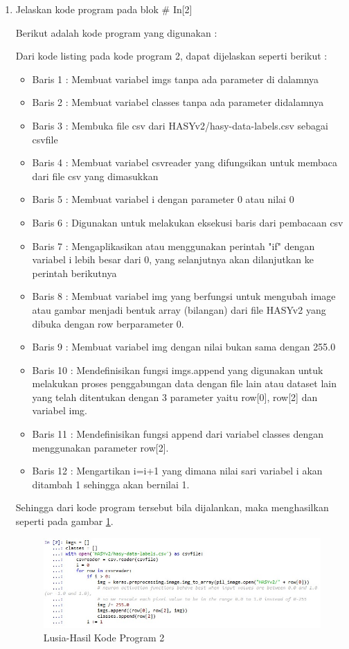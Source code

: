 \begin{enumerate}
\item Jelaskan kode program pada blok \# In[2]
	\par Berikut adalah kode program yang digunakan :
	
	\par Dari kode listing pada kode program 2, dapat dijelaskan seperti berikut :
	\begin{itemize}
	\item Baris 1	: Membuat variabel imgs tanpa ada parameter di dalamnya
	\item Baris 2	: Membuat variabel classes tanpa ada parameter didalamnya
	\item Baris 3	: Membuka file csv dari HASYv2/hasy-data-labels.csv sebagai csvfile
	\item Baris 4	: Membuat variabel csvreader yang difungsikan untuk membaca dari file csv yang dimasukkan
	\item Baris 5	: Membuat variabel i dengan parameter 0 atau nilai 0
	\item Baris 6	: Digunakan untuk melakukan eksekusi baris dari pembacaan csv 
	\item Baris 7	: Mengaplikasikan atau menggunakan perintah "if" dengan variabel i lebih besar dari 0, yang selanjutnya akan dilanjutkan ke perintah berikutnya
	\item Baris 8	: Membuat variabel img yang berfungsi untuk mengubah image atau gambar menjadi bentuk array (bilangan) dari file HASYv2 yang dibuka dengan row berparameter 0.
	\item Baris 9	: Membuat variabel img dengan nilai bukan sama dengan 255.0
	\item Baris 10	: Mendefinisikan fungsi imgs.append yang digunakan untuk melakukan proses penggabungan data dengan file lain atau dataset lain yang telah ditentukan dengan 3 parameter yaitu row[0], row[2] dan variabel img.
	\item Baris 11	: Mendefinisikan fungsi append dari variabel classes dengan menggunakan parameter row[2].
	\item Baris 12	: Mengartikan i=i+1 yang dimana nilai sari variabel i akan ditambah 1 sehingga akan bernilai 1.
	\end{itemize}
	\par Sehingga dari kode program tersebut bila dijalankan, maka menghasilkan seperti pada gambar \ref{7B2}.
		\begin{figure}[!hbtp]
		\centering
		\includegraphics[scale=0.5]{figures/w2.jpg}
		\caption{Lusia-Hasil Kode Program 2}
		\label{7B2}
		\end{figure}
	

\end{enumerate}
